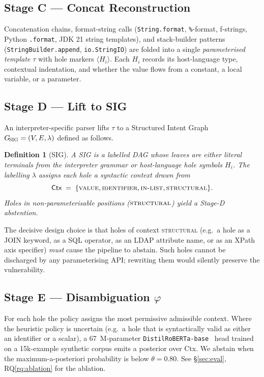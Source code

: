 \documentclass[conference]{IEEEtran}
\newtheorem{definition}{Definition}
\newcommand{\sig}{\textsc{SIG}}
\newcommand{\sigP}{\ensuremath{G_{\!\sig}}}
\newcommand{\phisig}{\ensuremath{\varphi}}
\newcommand{\rqref}[1]{RQ\ref{rq:#1}}
\begin{document}
\subsection{Stage C --- Concat Reconstruction}
Concatenation chains, format-string calls
(\texttt{String.format}, \texttt{\%}-format, f-strings, Python
\texttt{.format}, JDK 21 string templates), and stack-builder
patterns (\texttt{StringBuilder.append}, \texttt{io.StringIO}) are
folded into a single \emph{parameterised template} $\tau$ with hole
markers $\langle H_i\rangle$. Each $H_i$ records its host-language
type, contextual indentation, and whether the value flows from a
constant, a local variable, or a parameter.

\subsection{Stage D --- Lift to \sig}
An interpreter-specific parser lifts $\tau$ to a Structured Intent
Graph $\sigP{} = (V,E,\lambda)$ defined as follows.

\begin{definition}[\sig{}]\label{def:sig}
A \sig{} is a labelled DAG whose leaves are either literal terminals
from the interpreter grammar or host-language hole symbols
$H_i$. The labelling $\lambda$ assigns each hole a \emph{syntactic
context} drawn from
\[
  \textsf{Ctx} \;=\; \{ \textsc{value}, \textsc{identifier},
                       \textsc{in-list}, \textsc{structural} \}.
\]
Holes in non-parameterisable positions
($\textsc{structural}$) yield a Stage-D abstention.
\end{definition}

The decisive design choice is that holes of context
\textsc{structural} (e.g.\ a hole as a JOIN keyword, as a SQL
operator, as an LDAP attribute name, or as an XPath axis specifier)
\emph{must} cause the pipeline to abstain.  Such holes cannot be
discharged by any parameterising API; rewriting them would silently
preserve the vulnerability.

\subsection{Stage E --- Disambiguation $\phisig$}\label{ssec:phi}
For each hole the policy assigns the most permissive admissible
context. Where the heuristic policy is uncertain (e.g.\ a hole that
is syntactically valid as either an identifier or a scalar), a
67~M-parameter \texttt{DistilRoBERTa-base}~\cite{sutton_distilbert_2020,
huggingface_distilroberta_2020} head trained on a 15k-example
synthetic corpus emits a posterior over \textsf{Ctx}. We abstain
when the maximum-a-posteriori probability is below
$\theta=0.80$. See \S\ref{sec:eval}, \rqref{ablation} for the
ablation.
\end{document}

